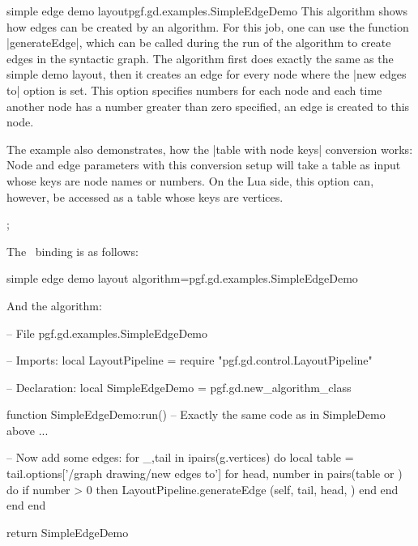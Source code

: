 \begin{gdalgorithm}{simple edge demo layout}{pgf.gd.examples.SimpleEdgeDemo}
  This algorithm shows how edges can be created by an algorithm. For
  this job, one can use the function |generateEdge|, which can be
  called during the run of the algorithm to create edges in the
  syntactic graph. The algorithm first does exactly the same as the
  simple demo layout, then it creates an edge for every node where the
  |new edges to| option is set. This option specifies numbers for each
  node and each time another node has a number greater than zero
  specified, an edge is created to this node.

  The example also demonstrates, how the |table with node keys|
  conversion works: Node and edge parameters with this conversion
  setup will take a table as input whose keys are node names or
  numbers. On the Lua side, this option can, however, be accessed as a
  table whose keys are vertices.

\begin{codeexample}[]
;
\end{codeexample}

The \tikzname\ binding is as follows:
\begin{codeexample}
                         {simple edge demo layout}
                         {algorithm=pgf.gd.examples.SimpleEdgeDemo}
\end{codeexample}

And the algorithm:
\begin{codeexample}
-- File pgf.gd.examples.SimpleEdgeDemo

-- Imports:
local LayoutPipeline = require "pgf.gd.control.LayoutPipeline"

-- Declaration:
local SimpleEdgeDemo = pgf.gd.new_algorithm_class {}

function SimpleEdgeDemo:run()
  -- Exactly the same code as in SimpleDemo above
  ...

  -- Now add some edges:
  for _,tail in ipairs(g.vertices) do
    local table = tail.options['/graph drawing/new edges to']
    for head, number in pairs(table or {}) do
      if number > 0 then
        LayoutPipeline.generateEdge (self, tail, head, {})
      end
    end
  end
end

return SimpleEdgeDemo
\end{codeexample}
\end{gdalgorithm}


